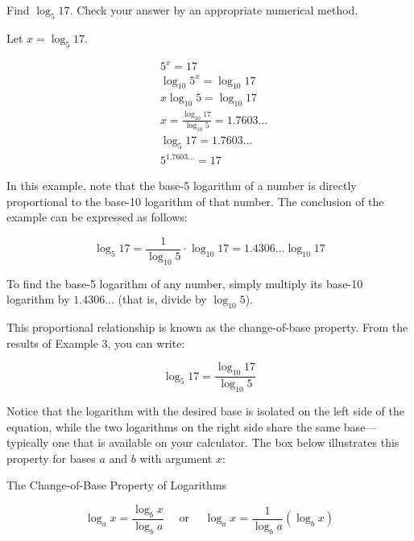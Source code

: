 \begin{example} Find $\log _5 17$. Check your answer by an appropriate numerical method.

\begin{solution} Let $x=\log _5 17$.

\begin{equation*}
\begin{aligned}
& 5^x=17 \\
& \log _{10} 5^x=\log _{10} 17 \\
& x \log _{10} 5=\log _{10} 17 \\
& x=\frac{\log _{10} 17}{\log _{10} 5}=1.7603 \ldots \\
& \log _5 17=1.7603 \ldots \\
& 5^{1.7603 \ldots}=17
\end{aligned}
\end{equation*}
\end{solution}
\end{example}

In this example, note that the base-5 logarithm of a number is directly proportional to the base-10 logarithm of that number. The conclusion of the example can be expressed as follows:

\[
\log_5 17 = \frac{1}{\log_{10} 5} \cdot \log_{10} 17 = 1.4306 \ldots \log_{10} 17
\]

To find the base-5 logarithm of any number, simply multiply its base-10 logarithm by \(1.4306 \ldots\) (that is, divide by \(\log_{10} 5\)).

This proportional relationship is known as the change-of-base property. From the results of Example 3, you can write:

\[
\log_5 17 = \frac{\log_{10} 17}{\log_{10} 5}
\]

Notice that the logarithm with the desired base is isolated on the left side of the equation, while the two logarithms on the right side share the same base—typically one that is available on your calculator. The box below illustrates this property for bases \(a\) and \(b\) with argument \(x\):

\begin{custombox}{The Change-of-Base Property of Logarithms}

\begin{equation*}
\log _a x=\frac{\log _b x}{\log _b a} \quad \text { or } \quad \log _a x=\frac{1}{\log _b a}\left(\log _b x\right)
\end{equation*}
    
\end{custombox}


